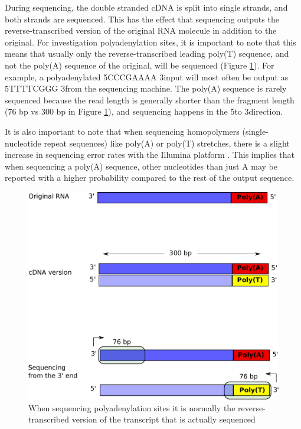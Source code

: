 During sequencing, the double stranded cDNA is split into single strands, and
both strands are sequenced. This has the effect that sequencing outputs the
reverse-transcribed version of the original RNA molecule in addition to the
original. For investigation polyadenylation sites, it is important to note that
this means that usually only the reverse-transcribed leading poly(T) sequence,
and not the poly(A) sequence of the original, will be sequenced (Figure
\ref{fig:polyT_seq}). For example, a polyadenylated 5\ppp CCCGAAAA 3\ppp input
will most often be output as 5\ppp TTTTCGGG 3\ppp from the sequencing machine.
The poly(A) sequence is rarely sequenced because the read length is generally
shorter than the fragment length (76 bp vs 300 bp in Figure
\ref{fig:polyT_seq}), and sequencing happens in the 5\ppp to 3\ppp direction.

It is also important to note that when sequencing homopolymers
(single-nucleotide repeat sequences) like poly(A) or poly(T) stretches, there
is a slight increase in sequencing error rates with the Illumina platform
\cite{minoche_evaluation_2011}. This implies that when sequencing a poly(A)
sequence, other nucleotides than just A may be reported with a higher
probability compared to the rest of the output sequence.

\begin{figure}[htb]
	\begin{center}
		\includegraphics[scale=0.4]{figures/introduction/polyT_sequencing.pdf}
	\end{center}
    \caption{When sequencing polyadenylation sites it is normally the
    reverse-transcribed version of the transcript that is actually sequenced}
	\label{fig:polyT_seq}
\end{figure}

